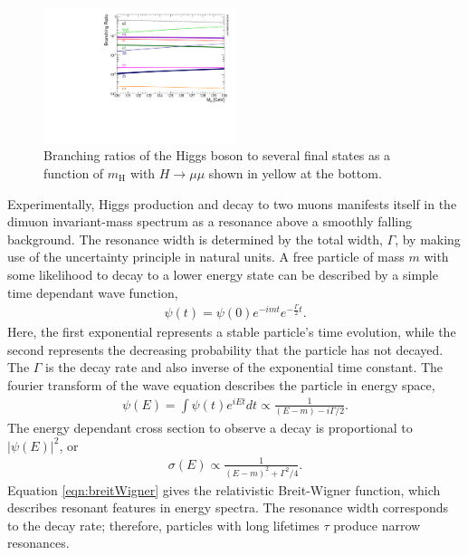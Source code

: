\begin{figure}[htb]
\captionsetup[subfigure]{position=b}
\centering
\includegraphics[width=0.5\textwidth]{figures/pheno/higgsBr.pdf}
\caption{Branching ratios of the Higgs boson to several final states as a function of $m_\text{H}$ with $H\to\mu\mu$ shown in yellow at the bottom.}
\label{fig:higgsBr}
\end{figure}

Experimentally, Higgs production and decay to two muons manifests itself in the dimuon invariant-mass spectrum as a resonance above a smoothly falling background.
The resonance width is determined by the total width, $ \Gamma $, by making use of the uncertainty principle in natural units.
A free particle of mass $m$ with some likelihood to decay to a lower energy state can be described by a simple time dependant wave function,
\begin{equation}\begin{split}
    \psi(t)=\psi(0)e^{-imt}e^{-\frac{\Gamma}{2}t}.
\end{split}\end{equation} 
Here, the first exponential represents a stable particle's time evolution, while the second represents the decreasing probability that the particle has not decayed.
The $\Gamma$ is the decay rate and also inverse of the exponential time constant.
The fourier transform of the wave equation describes the particle in energy space,
\begin{equation}\begin{split}
    \psi(E)=\int\psi(t)e^{iEt}dt\propto \frac{1}{(E-m)-i\Gamma/2}.
\end{split}\end{equation}
The energy dependant cross section to observe a decay is proportional to $|\psi(E)|^2$, or 
\begin{equation}\begin{split}\label{eqn:breitWigner}
    \sigma(E)\propto\frac{1}{(E-m)^2+\Gamma^2/4}.
\end{split}\end{equation} 
Equation \ref{eqn:breitWigner} gives the relativistic Breit-Wigner function, which describes resonant features in energy spectra.
The resonance width corresponds to the decay rate; therefore, particles with long lifetimes $\tau$ produce narrow resonances.

